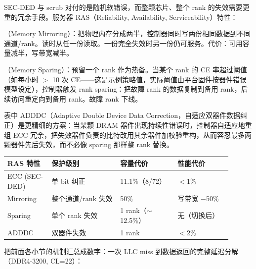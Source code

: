 

SEC-DED 与 scrub 对付的是随机软错误，而整颗芯片、整个 rank 的失效需要更重的冗余手段。服务器 RAS（Reliability, Availability, Serviceability）特性：

（Memory Mirroring）：把物理内存分成两半，控制器同时写两份相同数据到不同通道/rank。读时从任一份读取。一份完全失效时另一份仍可服务。代价：可用容量减半，写带宽减半。

（Memory Sparing）：预留一个 rank 作为热备。当某个 rank 的 CE 率超过阈值（如每小时 $>$ 10 次 CE——这是示例策略值，实际阈值由平台固件按器件错误模型设定），控制器触发 rank sparing：把故障 rank 的数据复制到备用 rank，后续访问重定向到备用 rank。故障 rank 下线。

表中 ADDDC（Adaptive Double Device Data Correction，自适应双器件数据纠正）是更精细的方案：当某颗 DRAM 器件出现持续性错误时，控制器自适应地重组 ECC 冗余，把失效器件负责的比特改用其余器件加校验重构，从而容忍最多两颗器件先后失效，而不必像 sparing 那样整 rank 替换。

\begin{longtable}{L{0.18\linewidth}L{0.28\linewidth}L{0.22\linewidth}L{0.22\linewidth}}
\toprule
RAS 特性 & 保护级别 & 容量代价 & 性能代价 \\
\midrule
ECC (SEC-DED) & 单 bit 纠正 & 11.1\%（8/72） & $<$1\% \\\tablerowrule
Mirroring & 整个通道/rank 失效 & 50\% & 写带宽 $-$50\% \\\tablerowrule
Sparing & 单个 rank 失效 & 1 rank（$\sim$12.5\%） & 无（切换后） \\\tablerowrule
ADDDC & 双器件失效 & 1 rank & $<$2\% \\
\bottomrule
\end{longtable}


把前面各小节的机制汇总成数字：一次 LLC miss 到数据返回的完整延迟分解（DDR4-3200, CL=22）：

